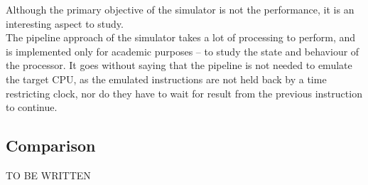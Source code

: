Although the primary objective of the simulator is not the performance, it is
an interesting aspect to study.\\
The pipeline approach of the simulator takes a lot of processing to perform,
and is implemented only for academic purposes -- to study the state and behaviour
of the processor. It goes without saying that the pipeline is not needed to
emulate the target CPU, as the emulated instructions are not held back by a time
restricting clock, nor do they have to wait for result from the previous instruction to
continue.\\

\subsection{Comparison}
TO BE WRITTEN

